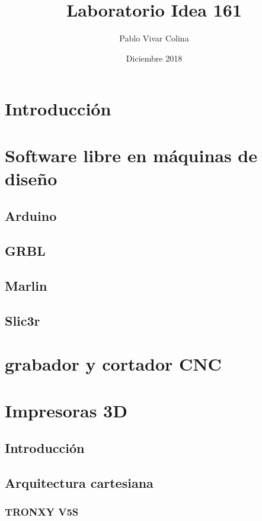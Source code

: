 \documentclass[]{article}
\title{Laboratorio Idea 161}
\author{Pablo Vivar Colina}
\date{Diciembre 2018}
\begin{document}
\maketitle

\section{Introducción}


\section{Software libre en máquinas de diseño}

\subsection{Arduino}

\subsection{GRBL}

\subsection{Marlin}

\subsection{Slic3r}


\section{grabador y cortador CNC}



\section{Impresoras 3D}

\subsection{Introducción}


\subsection{Arquitectura cartesiana}

\subsubsection{TRONXY V5S}
\end{document}
